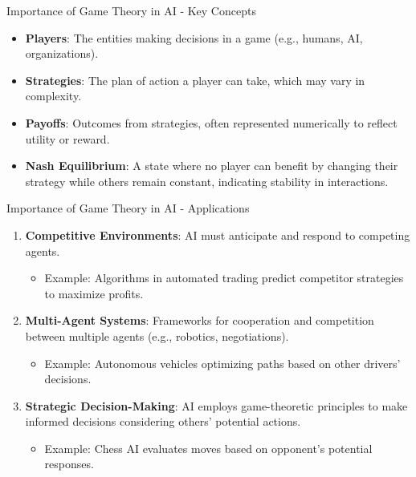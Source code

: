 \documentclass[aspectratio=169]{beamer}
\begin{document}
\begin{frame}[fragile]{Importance of Game Theory in AI - Key Concepts}
    \begin{itemize}
        \item \textbf{Players}: The entities making decisions in a game (e.g., humans, AI, organizations).
        \item \textbf{Strategies}: The plan of action a player can take, which may vary in complexity.
        \item \textbf{Payoffs}: Outcomes from strategies, often represented numerically to reflect utility or reward.
        \item \textbf{Nash Equilibrium}: A state where no player can benefit by changing their strategy while others remain constant, indicating stability in interactions.
    \end{itemize}
\end{frame}

\begin{frame}[fragile]{Importance of Game Theory in AI - Applications}
    \begin{enumerate}
        \item \textbf{Competitive Environments}: AI must anticipate and respond to competing agents.
            \begin{itemize}
                \item Example: Algorithms in automated trading predict competitor strategies to maximize profits.
            \end{itemize}
        
        \item \textbf{Multi-Agent Systems}: Frameworks for cooperation and competition between multiple agents (e.g., robotics, negotiations).
            \begin{itemize}
                \item Example: Autonomous vehicles optimizing paths based on other drivers' decisions.
            \end{itemize}
        
        \item \textbf{Strategic Decision-Making}: AI employs game-theoretic principles to make informed decisions considering others' potential actions.
            \begin{itemize}
                \item Example: Chess AI evaluates moves based on opponent's potential responses.
            \end{itemize}
    \end{enumerate}
\end{frame}
\end{document}

